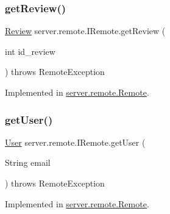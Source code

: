 \mbox{\label{interfaceserver_1_1remote_1_1_i_remote_a7b3462a438579c85dc7f097acf9cec41}} 
\subsubsection{\texorpdfstring{get\+Review()}{getReview()}}
{\footnotesize\ttfamily \hyperlink{classserver_1_1data_1_1_review}{Review} server.\+remote.\+I\+Remote.\+get\+Review (\begin{DoxyParamCaption}\item[{int}]{id\+\_\+review }\end{DoxyParamCaption}) throws Remote\+Exception}



Implemented in \hyperlink{classserver_1_1remote_1_1_remote_a98bd7181568c637a6cbcc0b72ebb9f95}{server.\+remote.\+Remote}.

\mbox{\label{interfaceserver_1_1remote_1_1_i_remote_ab741cf58a7e2b18ba36069d14d9d04ef}} 
\subsubsection{\texorpdfstring{get\+User()}{getUser()}}
{\footnotesize\ttfamily \hyperlink{classserver_1_1data_1_1_user}{User} server.\+remote.\+I\+Remote.\+get\+User (\begin{DoxyParamCaption}\item[{String}]{email }\end{DoxyParamCaption}) throws Remote\+Exception}



Implemented in \hyperlink{classserver_1_1remote_1_1_remote_abef8350014445d8f2d5ffb4c088e82b6}{server.\+remote.\+Remote}.

\mbox{\label{interfaceserver_1_1remote_1_1_i_remote_a9e52d282ba2386018ebd6817459a743f}} 

